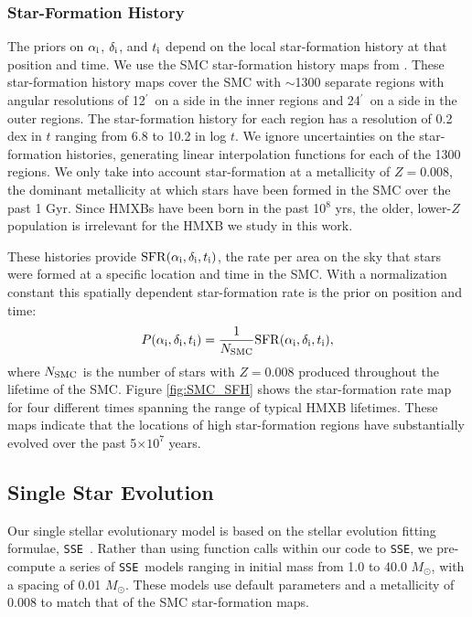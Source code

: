 \documentclass[usenatbib]{mnras}
\newcommand{\amin}{\ifmmode {^{\prime}\ }\else$^{\prime}$\fi}
\newcommand{\Msun}{\ifmmode {M_{\odot}}\else${M_{\odot}}$\fi}
\newcommand{\sse}{{\tt SSE}}
\begin{document}
\subsubsection{Star-Formation History}


The priors on $\alpha_{\rm i}$, $\delta_{\rm i}$, and $t_{\rm i}$ depend on the local star-formation history at that position and time. We use the SMC star-formation history maps from \citet{harris04}. These star-formation history maps cover the SMC with $\sim$1300 separate regions with angular resolutions of 12\amin\ on a side in the inner regions and 24\amin\ on a side in the outer regions. The star-formation history for each region has a resolution of 0.2 dex in $t$ ranging from 6.8 to 10.2 in log $t$. We ignore uncertainties on the star-formation histories, generating linear interpolation functions for each of the 1300 regions. We only take into account star-formation at a metallicity of $Z=0.008$, the dominant metallicity at which stars have been formed in the SMC over the past 1 Gyr. Since HMXBs have been born in the past 10$^8$ yrs, the older, lower-$Z$ population is irrelevant for the HMXB we study in this work.

These histories provide ${\rm SFR}(\alpha_{\rm i}, \delta_{\rm i}, t_{\rm i})$, the rate per area on the sky that stars were formed at a specific location and time in the SMC. With a normalization constant this spatially dependent star-formation rate is the prior on position and time:
\begin{equation}
P(\alpha_{\rm i}, \delta_{\rm i}, t_{\rm i}) = \frac{1}{N_{\rm SMC}} {\rm SFR}(\alpha_{\rm i}, \delta_{\rm i}, t_{\rm i}),
\end{equation}
where $N_{\rm SMC}$ is the number of stars with $Z=0.008$ produced throughout the lifetime of the SMC. Figure \ref{fig:SMC_SFH} shows the star-formation rate map for four different times spanning the range of typical HMXB lifetimes. These maps indicate that the locations of high star-formation regions have substantially evolved over the past 5$\times10^7$ years.




\subsection{Single Star Evolution} \label{sec:single_star}

Our single stellar evolutionary model is based on the stellar evolution fitting formulae, \sse\ \citep{hurley00}. Rather than using function calls within our code to \sse, we pre-compute a series of \sse\ models ranging in initial mass from 1.0 to 40.0 \Msun, with a spacing of 0.01 \Msun. These models use default parameters and a metallicity of 0.008 to match that of the SMC star-formation maps. 
\end{document}
